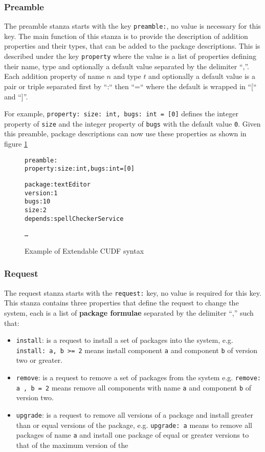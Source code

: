 \subsubsection{Preamble}
The preamble stanza starts with the key \verb+preamble:+, no value is necessary for this key.
The main function of this stanza is to provide the description of addition properties and their types, that can be added to the package descriptions.
This is described under the key \verb+property+ where the value is a list of properties defining their name, type and optionally a default value separated by the delimiter ``,''.
Each addition property of name $n$ and type $t$ and optionally a default value is a pair or triple separated first by ``:`` then ``=`` where the default is wrapped in ``[`` and ``]''.

For example, \verb+property: size: int, bugs: int = [0]+ defines the integer property of \verb+size+ and the integer property of \verb+bugs+ with the default value \verb+0+.
Given this preamble, package descriptions can now use these properties as shown in figure \ref{formal.cudfextensionexample}

\begin{figure}[htp] 
\begin{center}
\begin{alltt}
preamble:
property: size: int, bugs: int = [0]

package: textEditor
version: 1
bugs: 10
size: 2
depends: spellCheckerService

\ldots

\end{alltt}
  \caption[Example of Extendable CUDF syntax]{Example of Extendable CUDF syntax}
  \label{formal.cudfextensionexample}
\end{center}
\end{figure}

\subsubsection{Request}
The request stanza starts with the \verb+request:+ key, no value is required for this key.
This stanza contains three properties that define the request to change the system,
each is a list of \textbf{package formulae} separated by the delimiter ``,'' such that:
\begin{itemize}
  \item \verb+install+: is a request to install a set of packages into the system,
  e.g. \verb+install: a, b >= 2+ means install component \verb+a+ and component \verb+b+ of version two or greater.
  \item \verb+remove+: is a request to remove a set of packages from the system 
  e.g. \verb+remove: a , b = 2+ means remove all components with name \verb+a+ and component \verb+b+ of version two.
  \item \verb+upgrade+: is a request to remove all versions of a package and install greater than or equal versions of the package,
  e.g. \verb+upgrade: a+ means to remove all packages of name \verb+a+ and install one package of equal or greater versions to that of the maximum version of the 
\end{itemize}

